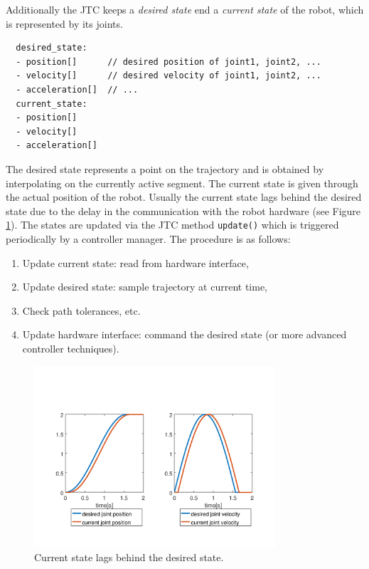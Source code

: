 \documentclass{article}
\begin{document}
Additionally the JTC keeps a \emph{desired state} end a \emph{current state} of the robot, which is represented by its joints.
\begin{verbatim}
  desired_state:
  - position[]      // desired position of joint1, joint2, ...
  - velocity[]      // desired velocity of joint1, joint2, ...
  - acceleration[]  // ...
  current_state:
  - position[]
  - velocity[]
  - acceleration[]
\end{verbatim}
The desired state represents a point on the trajectory and is obtained by interpolating on the currently active segment. The current state is given through the actual position of the robot. Usually the current state lags behind the desired state due to the delay in the communication with the robot hardware (see Figure \ref{fig:desired_current}). The states are updated via the JTC method \verb!update()! which is triggered periodically by a controller manager. The procedure is as follows:
\begin{enumerate}
\item Update current state: read from hardware interface,
\item Update desired state: sample trajectory at current time,
\item\label{enu:update_checks} Check path tolerances, etc.
\item Update hardware interface: command the desired state (or more advanced controller techniques).
\end{enumerate}

\begin{figure}
\centering
\includegraphics[width=0.8\textwidth]{figures/desired_current_plot.png}
\caption{Current state lags behind the desired state.}
\label{fig:desired_current}
\end{figure}
\end{document}
